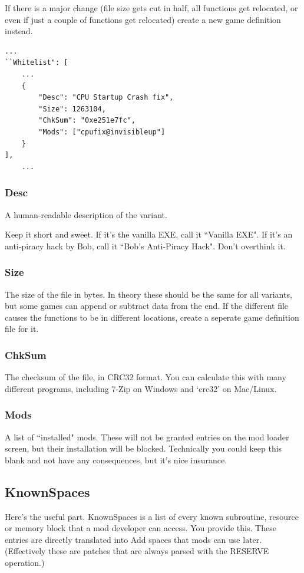 \documentclass[12pt,a4paper,notitlepage]{article}
\begin{document}
If there is a major change (file size gets cut in half, all functions get relocated, or even if just a couple of functions get relocated) create a new game definition instead.

\begin{lstlisting}[breaklines=true]
...
``Whitelist": [
    ...
    {
        "Desc": "CPU Startup Crash fix",
        "Size": 1263104,
        "ChkSum": "0xe251e7fc",
        "Mods": ["cpufix@invisibleup"]
    }
],
    ...
\end{lstlisting}

\subsubsection{Desc}
A human-readable description of the variant.

Keep it short and sweet. If it's the vanilla EXE, call it ``Vanilla EXE". If it's an anti-piracy hack by Bob, call it ``Bob's Anti-Piracy Hack". Don't overthink it.

\subsubsection{Size}
The size of the file in bytes. In theory these should be the same for all variants, but some games can append or subtract data from the end. If the different file causes the functions to be in different locations, create a seperate game definition file for it.

\subsubsection{ChkSum}
The checksum of the file, in CRC32 format. You can calculate this with many different programs, including 7-Zip on Windows and `crc32' on Mac/Linux.

\subsubsection{Mods}
A list of ``installed" mods. These will not be granted entries on the mod loader screen, but their installation will be blocked. Technically you could keep this blank and not have any consequences, but it's nice insurance.

\subsection{KnownSpaces}
Here's the useful part. KnownSpaces is a list of every known subroutine, resource or memory block that a mod developer can access. You provide this. These entries are directly translated into Add spaces that mods can use later. (Effectively these are patches that are always parsed with the RESERVE operation.)
\end{document}
